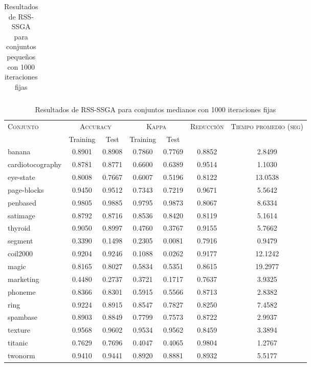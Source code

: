 \begin{table}[]
\begin{tabular}{l c c c c c c}
\hline
\end{tabular}
\caption{Resultados de RSS-SSGA para conjuntos pequeños con 1000 iteraciones fijas}
\label{res-peq-RSS-ssga}
\end{table}


\begin{table}[]
\centering
\begin{tabular}{l c c c c c c}
\hline
\multirow{2}{*}{\textsc{Conjunto}}
	& \multicolumn{2}{c}{\textsc{Accuracy}}
	& \multicolumn{2}{c}{\textsc{Kappa}}
	& \textsc{Reducción}
	& \textsc{Tiempo promedio (seg)} \\
	& Training & Test
	& Training & Test \\ 
\hline
\hline

banana & 0.8901 & 0.8908 & 0.7860 & 0.7769 & 0.8852 & 2.8499 \\
cardiotocography & 0.8781 & 0.8771 & 0.6600 & 0.6389 & 0.9514 & 1.1030 \\
eye-state & 0.8008 & 0.7667 & 0.6007 & 0.5196 & 0.8122 & 13.0538 \\
page-blocks & 0.9450 & 0.9512 & 0.7343 & 0.7219 & 0.9671 & 5.5642 \\
penbased & 0.9805 & 0.9885 & 0.9795 & 0.9873 & 0.8067 & 8.6334 \\
satimage & 0.8792 & 0.8716 & 0.8536 & 0.8420 & 0.8119 & 5.1614 \\
thyroid & 0.9050 & 0.8997 & 0.4760 & 0.3767 & 0.9155 & 5.7662 \\
segment & 0.3390 & 0.1498 & 0.2305 & 0.0081 & 0.7916 & 0.9479 \\
coil2000 & 0.9204 & 0.9246 & 0.1088 & 0.0262 & 0.9177 & 12.1242 \\
magic & 0.8165 & 0.8027 & 0.5834 & 0.5351 & 0.8615 & 19.2977 \\
marketing & 0.4480 & 0.2737 & 0.3721 & 0.1717 & 0.7637 & 3.9325 \\
phoneme & 0.8366 & 0.8301 & 0.5915 & 0.5566 & 0.8713 & 2.8382 \\
ring & 0.9224 & 0.8915 & 0.8547 & 0.7827 & 0.8250 & 7.4582 \\
spambase & 0.8903 & 0.8849 & 0.7799 & 0.7573 & 0.8722 & 2.9937 \\
texture & 0.9568 & 0.9602 & 0.9534 & 0.9562 & 0.8459 & 3.3894 \\
titanic & 0.7629 & 0.7696 & 0.4047 & 0.4065 & 0.9804 & 1.2767 \\
twonorm & 0.9410 & 0.9441 & 0.8920 & 0.8881 & 0.8932 & 5.5177 \\

\hline
\end{tabular}
\caption{Resultados de RSS-SSGA para conjuntos medianos con 1000 iteraciones fijas}
\label{res-med-RSS-ssga}
\end{table}


